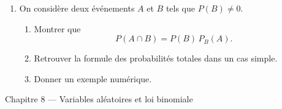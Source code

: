 \documentclass[11pt,a4paper]{article}
\begin{document}
\begin{enumerate}[label=\textbf{Exercice \arabic*.}, leftmargin=*, itemsep=1em]
\item On considère deux événements \(A\) et \(B\) tels que \(P(B)\neq 0\).

\begin{enumerate}[label=\alph*)]
    \item Montrer que
    \[
    P(A\cap B)=P(B)\,P_B(A).
    \]
    \item Retrouver la formule des probabilités totales dans un cas simple.
    \item Donner un exemple numérique.
\end{enumerate}

\end{enumerate}

\begin{chapitrebox}{Chapitre 8 --- Variables aléatoires et loi binomiale}
\end{chapitrebox}
\end{document}

